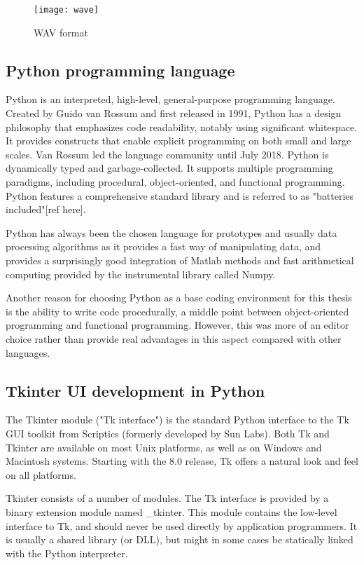 \documentclass[12pt]{report}
\begin{document}
\begin{figure}[h]
\centering
\texttt{[image: wave]}
\caption{WAV format}
\label{fig:wave}
\end{figure}

\subsection{Python programming language}

Python is an interpreted, high-level, general-purpose programming language. Created by Guido van Rossum and first released in 1991, Python has a design philosophy that emphasizes code readability, notably using significant whitespace. It provides constructs that enable explicit programming on both small and large scales. Van Rossum led the language community until July 2018.
Python is dynamically typed and garbage-collected. It supports multiple programming paradigms, including procedural, object-oriented, and functional programming. Python features a comprehensive standard library and is referred to as "batteries included"[ref here].

Python has always been the chosen language for prototypes and usually data processing algorithms as it provides a fast way of manipulating data, and provides a surprisingly good integration of Matlab methods and fast arithmetical computing provided by the instrumental library called Numpy.

Another reason for choosing Python as a base coding environment for this thesis is the ability to write code procedurally, a middle point between object-oriented programming and functional programming. However, this was more of an editor choice rather than provide real advantages in this aspect compared with other languages.
\subsection{Tkinter UI development in Python}
The Tkinter module ("Tk interface") is the standard Python interface to the Tk GUI toolkit from Scriptics (formerly developed by Sun Labs).
Both Tk and Tkinter are available on most Unix platforms, as well as on Windows and Macintosh systems. Starting with the 8.0 release, Tk offers a natural look and feel on all platforms.

Tkinter consists of a number of modules. The Tk interface is provided by a binary extension module named \_tkinter. This module contains the low-level interface to Tk, and should never be used directly by application programmers. It is usually a shared library (or DLL), but might in some cases be statically linked with the Python interpreter.
\end{document}
